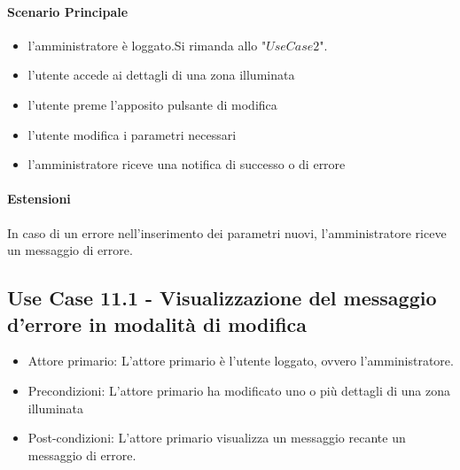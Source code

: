\documentclass[12pt]{article}
\begin{document}
\paragraph{Scenario Principale}
\begin{itemize}
	\item l'amministratore è loggato.Si rimanda allo "$Use Case 2$".
	\item l'utente accede ai dettagli di una zona illuminata
	\item l'utente preme l'apposito pulsante di modifica
	\item l'utente modifica i parametri necessari
	\item l'amministratore riceve una notifica di successo o di errore
\end{itemize}
\paragraph{Estensioni} In caso di un errore nell'inserimento dei parametri nuovi, l'amministratore riceve un messaggio di errore.

\subsection{Use Case 11.1 - Visualizzazione del messaggio d'errore in modalità di modifica}
\begin{itemize}
	\item Attore primario: L'attore primario è l'utente loggato, ovvero l'amministratore.
	\item Precondizioni: L'attore primario ha modificato uno o più dettagli di una zona illuminata
	\item Post-condizioni: L'attore primario visualizza un messaggio recante un messaggio di errore.
\end{itemize}
\end{document}
